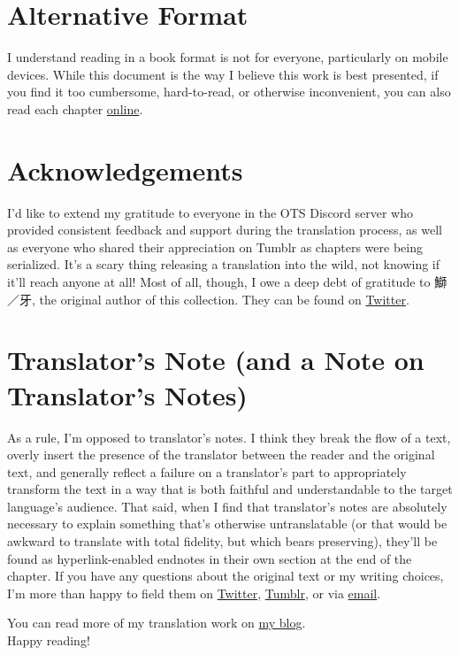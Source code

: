 \section*{Alternative Format}
I understand reading in a book format is not for everyone, particularly on mobile devices. While this document is the way I believe this work is best presented, if you find it too cumbersome, hard-to-read, or otherwise inconvenient, you can also read each chapter \href{https://lynne.bearblog.dev/blog/?q=octo84}{online}.

\section*{Acknowledgements}
I'd like to extend my gratitude to everyone in the OTS Discord server who provided consistent feedback and support during the translation process, as well as everyone who shared their appreciation on Tumblr as chapters were being serialized. It's a scary thing releasing a translation into the wild, not knowing if it'll reach anyone at all! Most of all, though, I owe a deep debt of gratitude to 鰤／牙, the original author of this collection. They can be found on \href{https://twitter.com/kiva_blitz}{Twitter}.

\section*{Translator's Note (and a Note on Translator's Notes)}
As a rule, I'm opposed to translator's notes. I think they break the flow of a text, overly insert the presence of the translator between the reader and the original text, and generally reflect a failure on a translator's part to appropriately transform the text in a way that is both faithful and understandable to the target language's audience. That said, when I find that translator's notes are absolutely necessary to explain something that's otherwise untranslatable (or that would be awkward to translate with total fidelity, but which bears preserving), they'll be found as hyperlink-enabled endnotes in their own section at the end of the chapter.
If you have any questions about the original text or my writing choices, I'm more than happy to field them on \href{https://twitter.com/plvpwaa}{Twitter}, \href{https://plvpwaa.tumblr.com}{Tumblr}, or via \href{mailto:plvpwaa@lynnux.org}{email}.

You can read more of my translation work on \href{https://lynne.bearblog.dev}{my blog}.
\\

Happy reading!